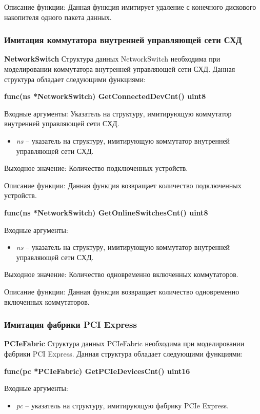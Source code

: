 Описание функции: Данная функция имитирует удаление с конечного дискового накопителя одного пакета данных.

\subsubsection{Имитация коммутатора внутренней управляющей сети СХД}

\textbf{NetworkSwitch}
Структура данных NetworkSwitch необходима при моделировании коммутатора внутренней управляющей сети СХД. Данная структура обладает следующими функциями:

\textbf{func(ns *NetworkSwitch) GetConnectedDevCnt() uint8}

Входные аргументы: Указатель на структуру, имитирующую коммутатор внутренней управляющей сети СХД.
\begin{itemize}
	\item \textit{ns} -- указатель на структуру, имитирующую коммутатор внутренней управляющей сети СХД.
\end{itemize}

Выходное значение: Количество подключенных устройств.

Описание функции: Данная функция возвращает количество подключенных устройств.

\textbf{func(ns *NetworkSwitch) GetOnlineSwitchesCnt() uint8}

Входные аргументы:
\begin{itemize}
	\item \textit{ns} -- указатель на структуру, имитирующую коммутатор внутренней управляющей сети СХД.
\end{itemize}

Выходное значение: Количество одновременно включенных коммутаторов.

Описание функции: Данная функция возвращает количество одновременно включенных коммутаторов.

\subsubsection{Имитация фабрики PCI Express}

\textbf{PCIeFabric}
Структура данных PCIeFabric необходима при моделировании фабрики PCI Express. Данная структура обладает следующими функциями:

\textbf{func(pc *PCIeFabric) GetPCIeDevicesCnt() uint16}

Входные аргументы:
\begin{itemize}
	\item \textit{pc} -- указатель на структуру, имитирующую фабрику PCIe Express.
\end{itemize}

